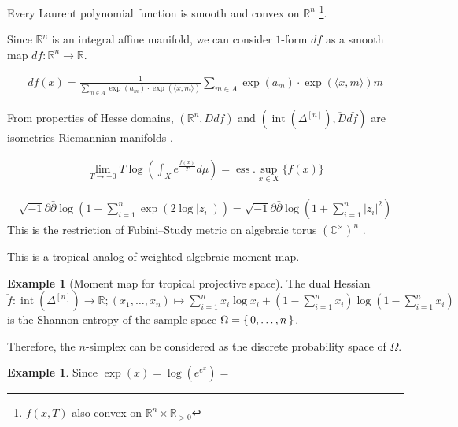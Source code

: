\documentclass[a4paper,dvipdfmx,reqno,12pt]{amsart}
\theoremstyle{definition}
\newtheorem{Eg}[Thm]{Example}
\newcommand{\C}{\mathbb{C}}%
\newcommand{\R}{\mathbb{R}}%
\newcommand{\opn}[1]{\operatorname{#1}}
\newcommand{\abk}[1]{\langle {#1} \rangle}%
\newcommand{\Paren}[1]{\left ( {#1} \right )}%
\numberwithin{equation}{section}
\begin{document}
Every Laurent polynomial function is smooth and convex on $\R^{n}$
\footnote{$f(x,T)$ also convex on $\R^{n}\times \R_{>0}$}.





Since $\R^{n}$ is an integral affine manifold, we can consider $1$-form $df$ as a smooth map
$df: \R^{n}\to \R$.

\begin{align}
  df(x)= \frac{1}{\sum_{m\in A} \opn{exp}(a_m)\cdot\opn{exp}(\abk{x,m})}
  \sum_{m\in A} \opn{exp}(a_m)\cdot\opn{exp}(\abk{x,m})m
\end{align}



From properties of Hesse domains, $(\R^{n},Ddf)$ and
$(\opn{int}(\Delta^{[n]}),\check{D}d\check{f})$ are isometrics
Riemannian manifolds \cite[Proposition 2.3.3]{}.




\begin{align}
  \lim_{T\to +0} T \log \Paren{\int_X e^{\frac{f(x)}{T}}d\mu}=
  \opn{ess}\!.\!\sup_{x\in X}\{f(x)\}
\end{align}

\begin{align}
  \sqrt{-1} \partial \bar{\partial}
  \log(1+\sum_{i=1}^{n}\opn{exp}(2\log |z_i|))
  =\sqrt{-1} \partial \bar{\partial}\log(1+\sum_{i=1}^{n}|z_i|^{2})
\end{align}
This is the restriction of Fubini--Study metric on algebraic torus
$(\C^{\times})^{n}$ \cite[Examples 3.1.9 i)]{MR2093043}.


This is a tropical analog of weighted algebraic moment map.



\begin{Eg}[Moment map for tropical projective space]
  The dual Hessian
  $\check{f}:\opn{int}(\Delta^{[n]})\to \R;
    (x_1,\ldots,x_n)\mapsto
    \sum_{i=1}^{n}x_i\log x_i+(1-\sum_{i=1}^{n}x_i )\log (1-\sum_{i=1}^{n}x_i )$
  is the Shannon entropy of the sample space $\Omega=\set{0,\ldots,n}$.



  Therefore, the $n$-simplex can be considered as the discrete probability space of
  $\Omega$.

\end{Eg}

\begin{Eg}
  Since $\opn{exp}(x)=\opn{log}(e^{e^{x}})=$
\end{Eg}
\end{document}
